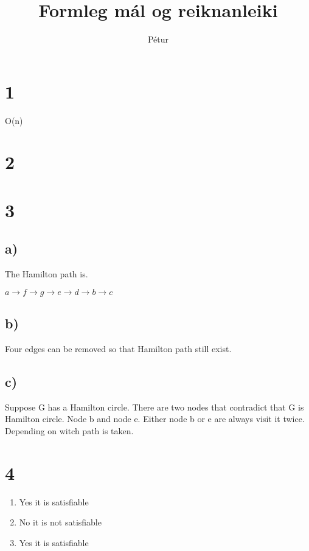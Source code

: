 \documentclass[]{article}
\begin{document}
\title{Formleg mál og reiknanleiki}
\author{Pétur}
\maketitle

\section*{1}
O(n)

\section*{2}

\section*{3}

\subsection*{a)}
The Hamilton path is.

$a \longrightarrow 
 f \longrightarrow
 g \longrightarrow
 e \longrightarrow
 d \longrightarrow
 b \longrightarrow
 c $
 
\subsection*{b)}

Four edges can be removed so that Hamilton path still exist.

\subsection*{c)}
Suppose G has a Hamilton circle. There are two nodes that contradict that G is Hamilton circle. Node b and node e. Either node b or e are always visit it twice. Depending on witch path is taken.

\section*{4}

\begin{enumerate}[label=\textbf{\alph*)}]
	\item Yes it is satisfiable
	\item No it is not satisfiable
	\item Yes it is satisfiable
\end{enumerate}
\end{document}
